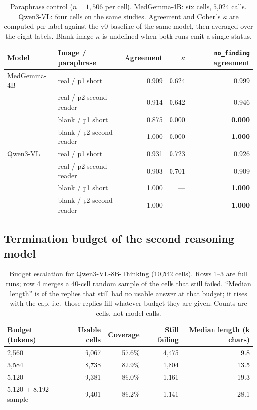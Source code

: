 \begin{table}[H]
\centering
\small
\caption{Paraphrase control ($n=1{,}506$ per cell). MedGemma-4B: six cells, 6,024 calls. Qwen3-VL: four cells on the same studies. Agreement and Cohen's $\kappa$ are computed per label against the v0 baseline of the same model, then averaged over the eight labels. Blank-image $\kappa$ is undefined when both runs emit a single status.}
\label{tab:r2para}
\begin{tabular}{llrrr}
\toprule
Model & Image / paraphrase & Agreement & $\kappa$ & \texttt{no\_finding} agreement \\
\midrule
MedGemma-4B & real / p1 short & 0.909 & 0.624 & 0.999 \\
 & real / p2 second reader & 0.914 & 0.642 & 0.946 \\
 & blank / p1 short & 0.875 & 0.000 & \textbf{0.000} \\
 & blank / p2 second reader & 1.000 & 0.000 & \textbf{1.000} \\
\midrule
Qwen3-VL & real / p1 short & 0.931 & 0.723 & 0.926 \\
 & real / p2 second reader & 0.903 & 0.701 & 0.909 \\
 & blank / p1 short & 1.000 & --- & \textbf{1.000} \\
 & blank / p2 second reader & 1.000 & --- & \textbf{1.000} \\
\bottomrule
\end{tabular}
\end{table}

\subsection*{Termination budget of the second reasoning model}

\begin{table}[H]
\centering
\small
\caption{Budget escalation for Qwen3-VL-8B-Thinking (10,542 cells). Rows 1--3 are full runs; row 4 merges a 40-cell random sample of the cells that still failed. ``Median length'' is of the replies that still had no usable answer at that budget; it rises with the cap, i.e.\ those replies fill whatever budget they are given. Counts are cells, not model calls.}
\label{tab:r2budget}
\begin{tabular}{lrrrr}
\toprule
Budget (tokens) & Usable cells & Coverage & Still failing & Median length (k chars) \\
\midrule
2,560 & 6,067 & 57.6\% & 4,475 & 9.8 \\
3,584 & 8,738 & 82.9\% & 1,804 & 13.5 \\
5,120 & 9,381 & 89.0\% & 1,161 & 19.3 \\
5,120 + 8,192 sample & 9,401 & 89.2\% & 1,141 & 28.1 \\
\bottomrule
\end{tabular}
\end{table}

